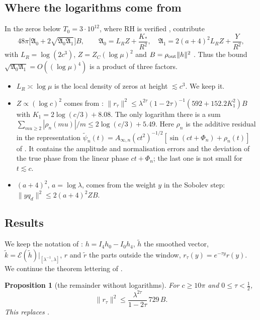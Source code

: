 \documentclass[11pt]{amsart}
\newtheorem{proposition}{Proposition}[section]
\theoremstyle{remark}
\numberwithin{equation}{section}
\newcommand{\E}{\mathcal{E}}
\begin{document}
\subsection{Where the logarithms come from}
In \cite[Section~6]{MoriWeilIII} the zeros below $T_0=3\cdot10^{12}$, where RH is verified \cite{PT21}, contribute
\begin{equation}\label{eq:oldL}
48\pi\bigl[\mathfrak A_0+2\sqrt{\mathfrak A_0\mathfrak A_1}\bigr]B,\qquad
\mathfrak A_0=L_RZ+\frac{K_*}{R^2},\quad \mathfrak A_1=2(a+4)^2L_RZ+\frac Y{R^2},
\end{equation}
with $L_R=\log(2c^3)$, $Z=Z_C(\log\mu)^2$ and $B=\rho_{\rm out}\|h\|^2$ \cite[Appendix~A]{MoriWeilIII}. Thus the bound $\sqrt{\mathfrak A_0\mathfrak A_1}=O((\log\mu)^4)$ is a product of three factors.
\begin{itemize}
\item $L_R\asymp\log\mu$ is the local density of zeros at height $\lesssim c^3$. We keep it.
\item $Z\propto(\log c)^2$ comes from \cite[Lemma~4.1]{MoriWeilII}: $\|r_\tau\|^2\le\lambda^{2\tau}(1-2\tau)^{-1}(592+152.2K_1^2)B$ with $K_1=2\log(c/3)+8.08$. The only logarithm there is a sum $\sum_{mu\ge2}|\rho_n(mu)|/m\le2\log(c/3)+5.49$. Here $\rho_n$ is the additive residual in the representation $\tilde\psi_n(t)=A_{\infty,n}(ct^2)^{-1/2}[\sin(ct+\Phi_n)+\rho_n(t)]$ of \cite[Lemma~3.6]{MoriWeilII}. It contains the amplitude and normalisation errors and the deviation of the true phase from the linear phase $ct+\Phi_n$; the last one is not small for $t\lesssim c$.
\item $(a+4)^2$, $a=\log\lambda$, comes from the weight $y$ in the Sobolev step: $\|yq_d\|^2\le2(a+4)^2ZB$.
\end{itemize}

\subsection{Results}\label{sec:intro-results}
We keep the notation of \cite{MoriWeilII,MoriWeilIII}: $h=I_4h_0-I_0h_4$, $\tilde h$ the smoothed vector, $\tilde k=\E(\tilde h)|_{[\lambda^{-1},\lambda]}$, $r$ and $\tilde r$ the parts outside the window, $r_\tau(y)=e^{-\tau y}r(y)$. We continue the theorem lettering of \cite{MoriWeilII,MoriWeilIII,MoriWeilIV}.

\begin{proposition}[the remainder without logarithms]\label{prop:M}
For $c\ge10\pi$ and $0\le\tau<\frac12$,
\[
\|r_\tau\|^2\le\frac{\lambda^{2\tau}}{1-2\tau}\,729\,B .
\]
This replaces \cite[Lemma~4.1]{MoriWeilII}.
\end{proposition}
\end{document}
